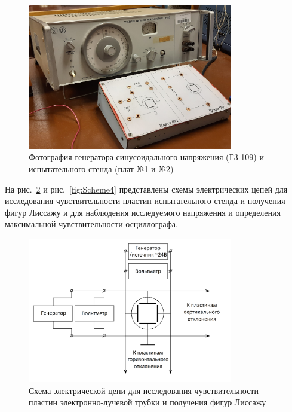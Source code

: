 \begin{figure}[H]
\centering
\includegraphics[width=0.8\textwidth]{Photo2.jpg}
\caption{Фотография генератора синусоидального напряжения (Г3-109) и испытательного стенда (плат №1 и №2)}
\label{fig:Photo2}
\end{figure}

На рис.~\ref{fig:Scheme3} и рис.~\ref{fig:Scheme4} представлены схемы электрических цепей для исследования чувствительности пластин испытательного стенда и получения фигур Лиссажу и для наблюдения исследуемого напряжения и определения максимальной чувствительности осциллографа.

\begin{figure}[H]
\centering
\includegraphics[width=0.8\textwidth]{Scheme3.png}
\caption{Схема электрической цепи для исследования чувствительности пластин электронно-лучевой трубки и получения фигур Лиссажу}
\label{fig:Scheme3}
\end{figure}

